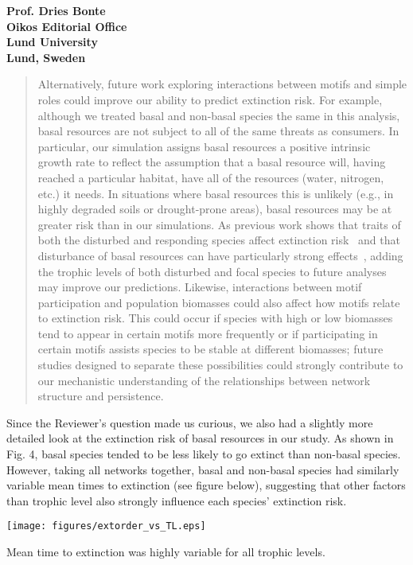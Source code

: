 \documentclass[12pt]{letter}
\begin{document}
\begin{letter}{\bf Prof. Dries Bonte\\
Oikos Editorial Office \\
Lund University \\
Lund, Sweden}
    \begin{quotation}
        Alternatively, future work exploring interactions between motifs and simple roles could improve our ability to predict extinction risk.
        For example, although we treated basal and non-basal species the same in this analysis, basal resources are not subject to all of the same threats as consumers.
        In particular, our simulation assigns basal resources a positive intrinsic growth rate to reflect the assumption that a basal resource will, having reached a particular habitat, have all of the resources (water, nitrogen, etc.) it needs. 
        In situations where basal resources this is unlikely (e.g., in highly degraded soils or drought-prone areas), basal resources may be at greater risk than in our simulations.
        As previous work shows that traits of both the disturbed and responding species affect extinction risk~\citep{Wootton2016} and that disturbance of basal resources can have particularly strong effects~\citep{Scherber2010}, adding the trophic levels of both disturbed and focal species to future analyses may improve our predictions.
        Likewise, interactions between motif participation and population biomasses could also affect how motifs relate to extinction risk.
        This could occur if species with high or low biomasses tend to appear in certain motifs more frequently or if participating in certain motifs assists species to be stable at different biomasses; future studies designed to separate these possibilities could strongly contribute to our mechanistic understanding of the relationships between network structure and persistence.
    \end{quotation}


    Since the Reviewer's question made us curious, we also had a slightly more detailed look at the extinction risk of basal resources in our study.
    As shown in Fig. 4, basal species tended to be less likely to go extinct than non-basal species. However, taking all networks together, basal and non-basal species had similarly variable mean times to extinction (see figure below), suggesting that other factors than trophic level also strongly influence each species' extinction risk. 

    \begin{minipage}{\textwidth}
        \centering
            \texttt{[image: figures/extorder\_vs\_TL.eps]}
            \caption{Mean time to extinction was highly variable for all trophic levels.}
    \end{minipage}


\end{letter}
\end{document}
